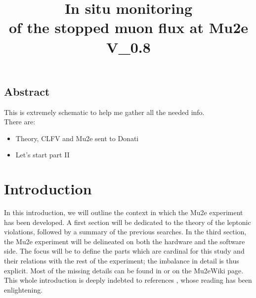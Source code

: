 \documentclass[12pt,a4paper,openright, oneside, titlepage]{book} %
\title{In situ monitoring\\ of the stopped muon flux at Mu2e\\\textbf{V\_0.8}}
\begin{document}
\frontmatter
	\begin{frontespizio}

	\end{frontespizio}

\maketitle
\chapter*{Abstract}
This is extremely schematic to help me gather all the needed info.\\
There are:
\begin{itemize}
\item Theory, CLFV and Mu2e sent to Donati
\item Let's start part II
\end{itemize}

\tableofcontents
\mainmatter
\part{Introduction}
In this introduction, we will outline the context in which the Mu2e experiment has been developed. A first section will be dedicated to the theory of the leptonic violations, followed by a summary of the previous searches. In the third section, the Mu2e experiment will be delineated on both the hardware and the software side. The focus will be  to define the parts which are cardinal for this study and their relations with the rest of the experiment; the imbalance in detail is thus explicit. Most of the missing details can be found in \cite{MTDR} or on the Mu2eWiki page.
This whole introduction is deeply indebted to references \cite{signorelli} \cite{bob_cflv} \cite{bob_mu2e} \cite{Manolis}, whose reading has been enlightening.
\end{document}
